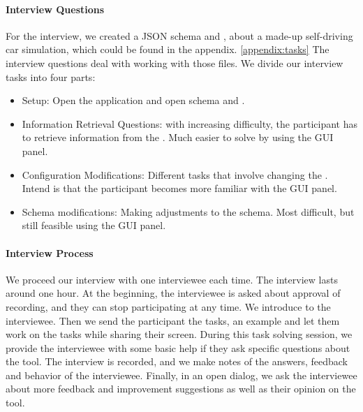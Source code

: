 \paragraph{Interview Questions}
For the interview, we created a JSON schema and \cfgfile{}, about a made-up self-driving car simulation, which could be found in the appendix. \ref{appendix:tasks}
The interview questions deal with working with those files.
We divide our interview tasks into four parts:
\begin{itemize}
    \item Setup: Open the application and open schema and \cfgfile.
    \item Information Retrieval Questions: with increasing difficulty, the participant has to retrieve information from the \cfgfile{}.
    Much easier to solve by using the GUI panel.
    \item Configuration Modifications: Different tasks that involve changing the \cfgfile{}.
    Intend is that the participant becomes more familiar with the GUI panel.
    \item Schema modifications: Making adjustments to the schema.
    Most difficult, but still feasible using the GUI panel.
\end{itemize}


\paragraph{Interview Process}
We proceed our interview with one interviewee each time.
The interview lasts around one hour.
At the beginning, the interviewee is asked about approval of recording, and they can stop participating at any time.
We introduce \toolname{} to the interviewee.
Then we send the participant the tasks, an example \cfgfile{} and let them work on the tasks while sharing their screen.
During this task solving session, we provide the interviewee with some basic help if they ask specific questions about the tool.
The interview is recorded, and we make notes of the answers, feedback and behavior of the interviewee.
Finally, in an open dialog, we ask the interviewee about more feedback and improvement suggestions as well as their opinion on the tool.

